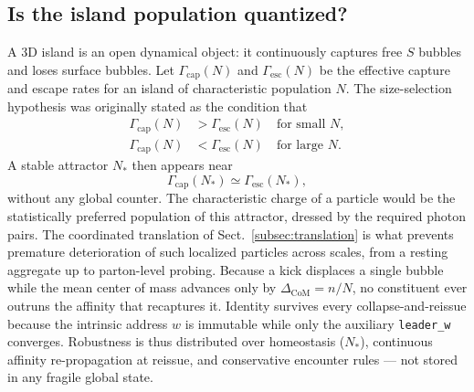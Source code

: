\documentclass{ijuc}
\begin{document}
\subsection{Is the island population quantized?}\label{subsec:dynamic-charge-quantization}
A 3D island is an open dynamical object: it continuously captures free $S$ bubbles and loses surface bubbles. Let $\Gamma_{\mathrm{cap}}(N)$ and $\Gamma_{\mathrm{esc}}(N)$ be the effective capture and escape rates for an island of characteristic population $N$. The size-selection hypothesis was originally stated as the condition that
\begin{align}
\Gamma_{\mathrm{cap}}(N) &> \Gamma_{\mathrm{esc}}(N) \quad \text{for small } N, \\
\Gamma_{\mathrm{cap}}(N) &< \Gamma_{\mathrm{esc}}(N) \quad \text{for large } N.
\end{align}
A stable attractor $N_*$ then appears near
\begin{equation}
\Gamma_{\mathrm{cap}}(N_*) \simeq \Gamma_{\mathrm{esc}}(N_*),
\end{equation}
without any global counter. The characteristic charge of a particle would be the statistically preferred population of this attractor, dressed by the required photon pairs.
The coordinated translation of Sect.~\ref{subsec:translation} is what prevents premature deterioration of such localized particles across scales, from a resting aggregate up to parton-level probing.  Because a kick displaces a single bubble while the mean center of mass advances only by $\Delta_{\mathrm{CoM}}=n/N$, no constituent ever outruns the affinity that recaptures it.  Identity survives every collapse-and-reissue because the intrinsic address $w$ is immutable while only the auxiliary \texttt{leader\_w} converges. Robustness is thus distributed over homeostasis ($N_*$), continuous affinity re-propagation at reissue, and conservative encounter rules --- not stored in any fragile global state.
\end{document}
